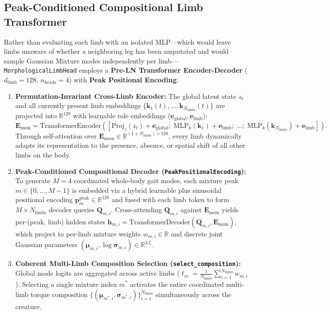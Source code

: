 \documentclass[11pt,a4paper]{article}
\begin{document}
\subsection{Peak-Conditioned Compositional Limb Transformer}
Rather than evaluating each limb with an isolated MLP—which would leave limbs unaware of whether a neighboring leg has been amputated and would sample Gaussian Mixture modes independently per limb—\texttt{MorphologicalLimbHead} employs a \textbf{Pre-LN Transformer Encoder-Decoder} ($d_{\text{limb}} = 128$, $n_{\text{heads}} = 4$) with \textbf{Peak Positional Encoding}:
\begin{enumerate}
    \item \textbf{Permutation-Invariant Cross-Limb Encoder:} The global latent state $z_t$ and all currently present limb embeddings $\{\mathbf{k}_1(t), \dots, \mathbf{k}_{N_{\text{limbs}}}(t)\}$ are projected into $\mathbb{R}^{128}$ with learnable role embeddings ($\mathbf{e}_{\text{global}}, \mathbf{e}_{\text{limb}}$):
    \begin{equation}
        \mathbf{E}_{\text{mem}} = \text{TransformerEncoder}\!\left(\left[\text{Proj}_z(z_t) + \mathbf{e}_{\text{global}};\; \text{MLP}_k(\mathbf{k}_1) + \mathbf{e}_{\text{limb}};\; \dots;\; \text{MLP}_k(\mathbf{k}_{N_{\text{limbs}}}) + \mathbf{e}_{\text{limb}}\right]\right).
    \end{equation}
    Through self-attention over $\mathbf{E}_{\text{mem}} \in \mathbb{R}^{(1 + N_{\text{limbs}}) \times 128}$, every limb dynamically adapts its representation to the presence, absence, or spatial shift of all other limbs on the body.
    \item \textbf{Peak-Conditioned Compositional Decoder (\texttt{PeakPositionalEncoding}):} To generate $M = 4$ coordinated whole-body gait modes, each mixture peak $m \in \{0, \dots, M-1\}$ is embedded via a hybrid learnable plus sinusoidal positional encoding $\mathbf{p}_m^{\text{peak}} \in \mathbb{R}^{128}$ and fused with each limb token to form $M \times N_{\text{limbs}}$ decoder queries $\mathbf{Q}_{m,i}$. Cross-attending $\mathbf{Q}_{m,i}$ against $\mathbf{E}_{\text{mem}}$ yields per-(peak, limb) hidden states $\mathbf{h}_{m,i} = \text{TransformerDecoder}(\mathbf{Q}_{m,i}, \mathbf{E}_{\text{mem}})$, which project to per-limb mixture weights $w_{m,i} \in \mathbb{R}$ and discrete joint Gaussian parameters $(\boldsymbol{\mu}_{m,i}, \log \boldsymbol{\sigma}_{m,i}) \in \mathbb{R}^{2 J_i}$.
    \item \textbf{Coherent Multi-Limb Composition Selection (\texttt{select\_composition}):} Global mode logits are aggregated across active limbs ($\ell_m = \frac{1}{N_{\text{limbs}}}\sum_{i=1}^{N_{\text{limbs}}} w_{m,i}$). Selecting a single mixture index $m^*$ activates the entire coordinated multi-limb torque composition $\{(\boldsymbol{\mu}_{m^*,i}, \boldsymbol{\sigma}_{m^*,i})\}_{i=1}^{N_{\text{limbs}}}$ simultaneously across the creature.
\end{enumerate}
\end{document}
